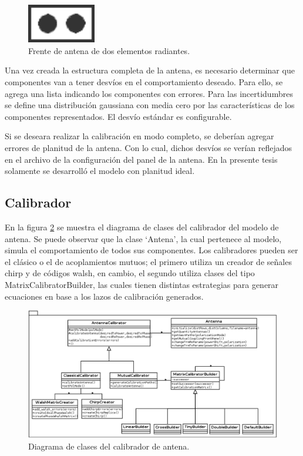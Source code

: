 \begin{figure}
 \centering
 \includegraphics[width=3cm]{gfx/FrontAntenna2.png}
 \caption{Frente de antena de dos elementos radiantes.}
 \label{fig:frontAntenna}
\end{figure}

Una vez creada la estructura completa de la antena, es necesario determinar que componentes van a tener desvíos en el
comportamiento deseado. Para ello, se agrega una lista indicando los componentes con errores. Para las incertidumbres se define
una distribución gaussiana con media cero por las características de los componentes representados. El desvío estándar es 
configurable.

Si se deseara realizar la calibración en modo completo, se deberían agregar errores de planitud de la antena. Con lo cual, 
dichos desvíos se verían reflejados en el archivo de la configuración del panel de la antena. En la presente tesis solamente 
se desarrolló el modelo con planitud ideal.


\subsection{Calibrador}

En la figura \ref{fig:modelPackage} se muestra el diagrama de clases del calibrador del modelo de antena. Se puede observar que
la clase \enquote*{Antena}, la cual pertenece al modelo, simula el comportamiento de todos sus componentes. Los calibradores
pueden ser el clásico o el de acoplamientos mutuos; el primero utiliza un creador de señales chirp y de códigos walsh, en
cambio, el segundo utiliza clases del tipo MatrixCalibratorBuilder, las cuales tienen distintas estrategias para generar
ecuaciones en base a los lazos de calibración generados.

\begin{figure}
 \centering
 \includegraphics[width=15cm]{gfx/modelPackage.png}
 \caption{Diagrama de clases del calibrador de antena.}
 \label{fig:modelPackage}
\end{figure}


